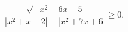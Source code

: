 \begin{ex}[type=inequality]
	\begin{condition}
		$\dfrac{\sqrt{-x^2 - 6x - 5}}{|x^2 + x - 2| - |x^2 + 7x + 6|}\geqslant0.$
	\end{condition}
\end{ex}